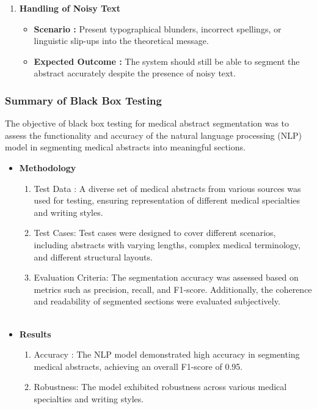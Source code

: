 \documentclass[12pt,a4paper]{report}     %
\begin{document}
\begin{normalsize}
{{{\begin{enumerate}
\begin{itemize}
    \end{itemize}
    \item \textbf{Handling of Noisy Text}\begin{itemize}
        \item \textbf{Scenario :} Present typographical blunders, incorrect spellings, or linguistic slip-ups into the theoretical message.
        \item \textbf{Expected Outcome :} The system should still be able to segment the abstract accurately despite the presence of noisy text.
    \end{itemize}
\end{enumerate}

\subsubsection{Summary of Black Box Testing}
 The objective of black box testing for medical abstract segmentation was to assess the functionality and accuracy of the natural language processing (NLP) model in segmenting medical abstracts into meaningful sections.
 \begin{itemize}
     \item \textbf{Methodology}
     \begin{enumerate}
         \item Test Data : A diverse set of medical abstracts from various sources was used for testing, ensuring representation of different medical specialties and writing styles.
         \item Test Cases: Test cases were designed to cover different scenarios, including abstracts with varying lengths, complex medical terminology, and different structural layouts.
         \item Evaluation Criteria: The segmentation accuracy was assessed based on metrics such as precision, recall, and F1-score. Additionally, the coherence and readability of segmented sections were evaluated subjectively. \\\\
     \end{enumerate}
     \item \textbf{Results}
     \begin{enumerate}
         \item Accuracy : The NLP model demonstrated high accuracy in segmenting medical abstracts, achieving an overall F1-score of 0.95.
         \item Robustness: The model exhibited robustness across various medical specialties and writing styles.

\end{enumerate}
\end{itemize}}}}
\end{normalsize}
\end{document}
